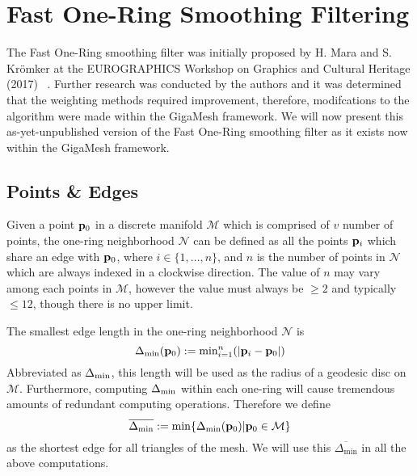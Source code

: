 \chapter{Fast One-Ring Smoothing Filtering}
The Fast One-Ring smoothing filter was initially proposed by H. Mara and S. Krömker at the EUROGRAPHICS Workshop on Graphics and Cultural Heritage (2017) ~\cite[s.~3.2]{Mara17}. Further research was conducted by the authors and it was determined that the weighting methods required improvement, therefore, modifcations to the algorithm were made within the GigaMesh framework. We will now present this as-yet-unpublished version of the Fast One-Ring smoothing filter as it exists now within the GigaMesh framework.
%
\section{Points \& Edges}
Given a point $\mathbf{p}_0$ in a discrete manifold $\mathcal{M}$ which is comprised of $v$ number of points, the one-ring neighborhood $\mathcal{N}$ can be defined as all the points $\mathbf{p}_i$ which share an edge with $\mathbf{p}_0$, where $i \in \{1, \ldots, n\}$, and $n$ is the number of points in $\mathcal{N}$ which are always indexed in a clockwise direction. The value of $n$ may vary among each points in $\mathcal{M}$, however the value must always be $\geq 2$ and typically $\leq 12$, though there is no upper limit.%
%
%
%
%
%
%
%

The smallest edge length in the one-ring neighborhood $\mathcal{N}$ is 
\begin{equation}
	\Delta_\text{min}(\mathbf{p}_0) := \text{min}^n_{i=1} (|\mathbf{p}_i - \mathbf{p}_0|)
	\label{eq:localMinimumEdgeLength}
\end{equation}
Abbreviated as $\Delta_\text{min}$, this length will be used as the radius of a geodesic disc on $\mathcal{M}$.  Furthermore, computing $\Delta_\text{min}$ within each one-ring will cause tremendous amounts of redundant computing operations. Therefore we define 
\begin{equation}
	\overline{\Delta_\text{min}} := \min\{\Delta_\text{min}(\mathbf{p}_0) | 
	\mathbf{p}_0 \in \mathcal{M}\}
\end{equation} 
as the shortest edge for all triangles of the mesh. We will use this 
$\overline{\Delta_\text{min}}$ in all the above computations.

